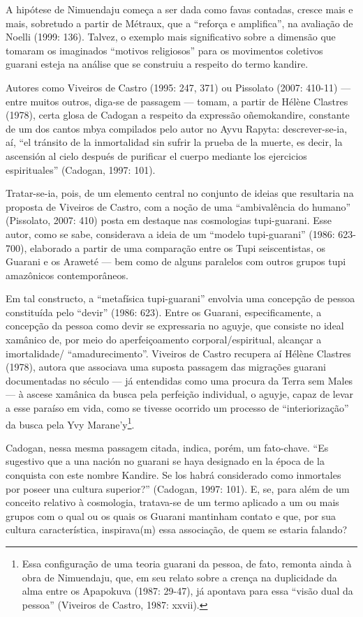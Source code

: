A hipótese de Nimuendaju começa a ser dada como favas contadas, cresce
mais e mais, sobretudo a partir de Métraux, que a ``reforça e
amplifica'', na avaliação de Noelli  (1999: 136). Talvez, o exemplo mais
significativo sobre a dimensão que tomaram os imaginados ``motivos
religiosos'' para os movimentos coletivos guarani esteja na análise que
se construiu a respeito do termo kandire.

Autores como Viveiros de Castro (1995: 247, 371) ou Pissolato (2007:
410-11) --- entre muitos outros, diga-se de passagem --- tomam, a partir de
Hélène Clastres (1978), certa glosa de Cadogan a respeito da expressão
oñemokandire, constante de um dos cantos mbya compilados pelo autor no
Ayvu Rapyta: descrever-se-ia, aí, ``el tránsito de la inmortalidad sin
sufrir la prueba de la muerte, es decir, la ascensión al cielo después
de purificar el cuerpo mediante los ejercicios espirituales'' (Cadogan,
1997: 101). 

Tratar-se-ia, pois, de um elemento central no conjunto de ideias que
resultaria na proposta de Viveiros de Castro, com a noção de uma
``ambivalência do humano'' (Pissolato, 2007: 410) posta em destaque nas
cosmologias tupi-guarani. Esse autor, como se sabe, considerava a ideia
de um ``modelo tupi-guarani'' (1986: 623-700), elaborado a partir de uma
comparação entre os Tupi seiscentistas, os Guarani e os Araweté --- bem
como de alguns paralelos com outros grupos tupi amazônicos
contemporâneos.

Em tal constructo, a ``metafísica tupi-guarani'' envolvia uma concepção de
pessoa constituída pelo ``devir'' (1986: 623). Entre os Guarani,
especificamente, a concepção da pessoa como devir se expressaria no
aguyje, que consiste no ideal xamânico de, por meio do aperfeiçoamento
corporal/espiritual, alcançar a imortalidade/ ``amadurecimento''.
Viveiros de Castro recupera aí Hélène Clastres (1978), autora que
associava uma suposta passagem das migrações guarani documentadas no
século  --- já entendidas como uma procura da Terra sem Males --- à
ascese xamânica da busca pela perfeição individual, o aguyje, capaz de
levar a esse paraíso em vida, como se tivesse ocorrido um processo de
``interiorização'' da busca pela Yvy Marane’y\footnote{Essa configuração
de uma teoria guarani da pessoa, de fato, remonta ainda à obra de
Nimuendaju, que, em seu relato sobre a crença na duplicidade da alma
entre os Apapokuva (1987: 29-47), já apontava para essa ``visão dual da
pessoa'' (Viveiros de Castro, 1987: xxvii).}.

Cadogan, nessa mesma passagem citada, indica, porém, um fato-chave. ``Es
sugestivo que a una nación no guarani se haya designado en la época de
la conquista con este nombre Kandire. Se los habrá considerado como
inmortales por poseer una cultura superior?'' (Cadogan, 1997: 101). E,
se, para além de um conceito relativo à cosmologia, tratava-se de um
termo aplicado a um ou mais grupos com o qual ou os quais os Guarani
mantinham contato e que, por sua cultura característica, inspirava(m)
essa associação, de quem se estaria falando?

